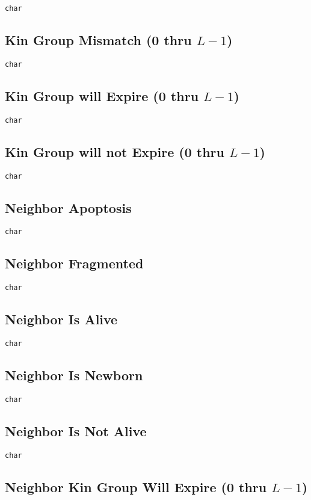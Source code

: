 \texttt{char}

\subsection{Kin Group Mismatch (0 thru $L-1$)}

\texttt{char}

\subsection{Kin Group will Expire (0 thru $L-1$)}

\texttt{char}

\subsection{Kin Group will not Expire (0 thru $L-1$)}

\texttt{char}

\subsection{Neighbor Apoptosis}

\texttt{char}

\subsection{Neighbor Fragmented}

\texttt{char}

\subsection{Neighbor Is Alive}

\texttt{char}

\subsection{Neighbor Is Newborn}

\texttt{char}

\subsection{Neighbor Is Not Alive}

\texttt{char}

\subsection{Neighbor Kin Group Will Expire (0 thru $L-1$)}

